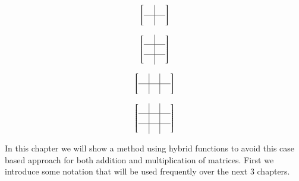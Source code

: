 \begin{figure}[ht]
	\caption[Possible block overlaps of $2 \times 2$ block matrices.]{There are 9 possible permutations. 1x (a) 2x (b) 2x (c) 4x (d)}
	\begin{subfigure}[b]{0.24\textwidth}
		\caption{}
		\begin{equation*}
			\left[ \begin{array}{c|c}
				\; & \; \\
				\hline
				& \\
			\end{array}\right]
		\end{equation*}
	\end{subfigure}
	\begin{subfigure}[b]{0.24\textwidth}
		\caption{}
		\begin{equation*}
			\left[ \begin{array}{c|c}
				\; & \; \\
				\hline
				& \\
				\hline
				& \\
			\end{array}\right]
		\end{equation*}
	\end{subfigure}
	\begin{subfigure}[b]{0.24\textwidth}
		\caption{}
		\begin{equation*}
			\left[ \begin{array}{c|c|c}
				\; & \; & \;  \\
				\hline
				& \\
			\end{array}\right]
		\end{equation*}
	\end{subfigure}
	\begin{subfigure}[b]{0.24\textwidth}
		\caption{}
		\begin{equation*}
			\left[ \begin{array}{c|c|c}
				\; & \; & \; \\
				\hline
				& \\
				\hline
				& \\
			\end{array}\right]
		\end{equation*}
	\end{subfigure}
\end{figure}


In this chapter we will show a method using hybrid functions to avoid this case based approach for both addition
and multiplication of matrices.
First we introduce some notation that will be used frequently over the next 3 chapters.

